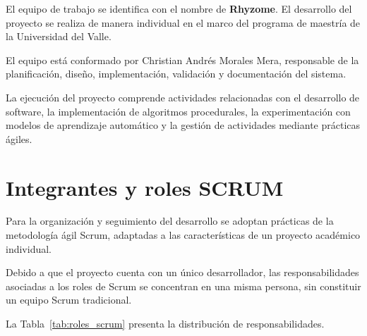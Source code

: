 El equipo de trabajo se identifica con el nombre de \textbf{Rhyzome}. El desarrollo del proyecto se realiza de manera individual en el marco del programa de maestría de la Universidad del Valle.

El equipo está conformado por Christian Andrés Morales Mera, responsable de la planificación, diseño, implementación, validación y documentación del sistema.

La ejecución del proyecto comprende actividades relacionadas con el desarrollo de software, la implementación de algoritmos procedurales, la experimentación con modelos de aprendizaje automático y la gestión de actividades mediante prácticas ágiles.


\section{Integrantes y roles SCRUM}

Para la organización y seguimiento del desarrollo se adoptan prácticas de la metodología  ágil Scrum, adaptadas a las características de un proyecto académico individual.

Debido a que el proyecto cuenta con un único desarrollador, las responsabilidades asociadas a los roles de Scrum se concentran en una misma persona, sin constituir un equipo Scrum tradicional.

La Tabla~\ref{tab:roles_scrum} presenta la
distribución de responsabilidades.


